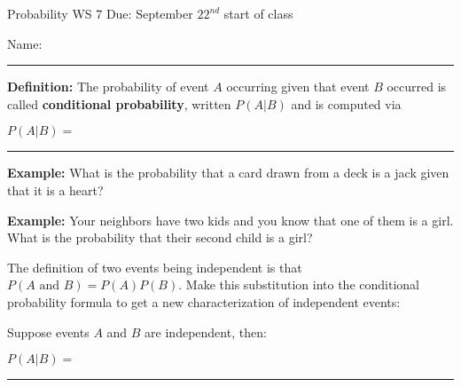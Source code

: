 \documentclass[oneside]{amsart}
\theoremstyle{definition}
\theoremstyle{definition}
\begin{document}
Probability \hfill {\huge WS 7} \hfill Due: September $22^{nd}$ start of class \\
\begin{flushright}
    {\Large Name:}\rule[-1mm]{75mm}{.1mm}
\end{flushright}

 \hrulefill
\vspace{2mm}

\begin{ovalbox}{\begin{minipage}{6.8in}
\vspace{5mm}

\textbf{Definition:} The probability of event $A$ occurring given that event $B$ occurred is called \textbf{conditional probability}, written $P(A|B)$ and is computed via \\
\begin{center}
  $P(A|B) =$ \rule[-5mm]{35mm}{.1mm}
\end{center}

\end{minipage}}
\end{ovalbox}

\vspace{3mm}


\textbf{Example:} What is the probability that a card drawn from a deck is a jack given that it is a heart?

\vfill

\textbf{Example:} Your neighbors have two kids and you know that one of them is a girl. What is the probability that their second child is a girl?

\vfill



The definition of two events being independent is that $P(A \text{ and } B) = P(A)P(B)$. Make this substitution into the conditional probability formula to get a new characterization of independent events:

\begin{ovalbox}{\begin{minipage}{6.8in}
\vspace{5mm}

Suppose events $A$ and $B$ are independent, then: \\
\begin{center}
  $P(A|B) =$ \rule[-5mm]{35mm}{.1mm}
\end{center}

\end{minipage}}
\end{ovalbox}
\end{document}
